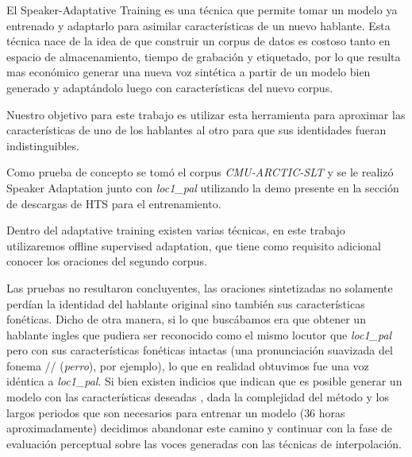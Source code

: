 El Speaker-Adaptative Training es una técnica que permite tomar un modelo ya entrenado y adaptarlo para asimilar características de un nuevo hablante. Esta técnica nace de la idea de que construir un corpus de datos es costoso tanto en espacio de almacenamiento, tiempo de grabación y etiquetado, por lo que resulta mas económico generar una nueva voz sintética a partir de un modelo bien generado y adaptándolo luego con características del nuevo corpus.

Nuestro objetivo para este trabajo es utilizar esta herramienta para aproximar las características de uno de los hablantes al otro para que sus identidades fueran indistinguibles.

Como prueba de concepto se tomó el corpus \textit{CMU-ARCTIC-SLT} y se le realizó Speaker Adaptation junto con \textit{loc1\_pal} utilizando la demo presente en la sección de descargas de HTS para el entrenamiento. 

Dentro del adaptative training existen varias técnicas, en este trabajo utilizaremos offline supervised adaptation, que tiene como requisito adicional conocer los oraciones del segundo corpus. 

Las pruebas no resultaron concluyentes, las oraciones sintetizadas no solamente perdían la identidad del hablante original sino también sus características fonéticas. Dicho de otra manera, si lo que buscábamos era que obtener un hablante ingles que pudiera ser reconocido como el mismo locutor que \textit{loc1\_pal} pero con sus características fonéticas intactas (una pronunciación suavizada del fonema // (\textit{perro}), por ejemplo), lo que en realidad obtuvimos fue una voz idéntica a \textit{loc1\_pal}. Si bien existen indicios que indican que es posible generar un modelo con las características deseadas\cite{statisticalParam} \cite{speakerSim}, dada la complejidad del método y los largos periodos que son necesarios para entrenar un modelo ($36$ horas aproximadamente) decidimos abandonar este camino y continuar con la fase de evaluación perceptual sobre las voces generadas con las técnicas de interpolación.